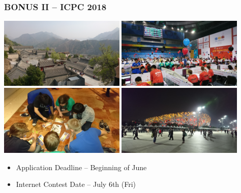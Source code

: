 \documentclass{beamer}
\begin{document}
\begin{frame}
  \frametitle{BONUS II -- ICPC 2018}

  \begin{center}
    \includegraphics[width=0.45\textwidth]{icpc2018/DSC_0171}
    \includegraphics[width=0.45\textwidth]{icpc2018/DSC_0195}\\
    \includegraphics[width=0.45\textwidth]{icpc2018/DSC_0199}
    \includegraphics[width=0.45\textwidth]{icpc2018/DSC_0208}
  \end{center}
  
  
  \begin{itemize}
  \item Application Deadline -- Beginning of June
  \item Internet Contest Date -- July 6th (Fri)
  \end{itemize}
\end{frame}
\end{document}
